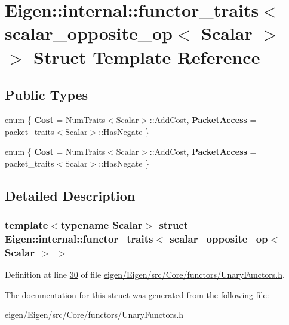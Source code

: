 \hypertarget{struct_eigen_1_1internal_1_1functor__traits_3_01scalar__opposite__op_3_01_scalar_01_4_01_4}{}\section{Eigen\+:\+:internal\+:\+:functor\+\_\+traits$<$ scalar\+\_\+opposite\+\_\+op$<$ Scalar $>$ $>$ Struct Template Reference}
\label{struct_eigen_1_1internal_1_1functor__traits_3_01scalar__opposite__op_3_01_scalar_01_4_01_4}
\subsection*{Public Types}
\begin{DoxyCompactItemize}
\item 
\mbox{\label{struct_eigen_1_1internal_1_1functor__traits_3_01scalar__opposite__op_3_01_scalar_01_4_01_4_afadcdb94bd849ac027779527420a3448}} 
enum \{ {\bfseries Cost} = Num\+Traits$<$Scalar$>$\+:\+:Add\+Cost, 
{\bfseries Packet\+Access} = packet\+\_\+traits$<$Scalar$>$\+:\+:Has\+Negate
 \}
\item 
\mbox{\label{struct_eigen_1_1internal_1_1functor__traits_3_01scalar__opposite__op_3_01_scalar_01_4_01_4_aedd367468a308aec9d1e1221622f6340}} 
enum \{ {\bfseries Cost} = Num\+Traits$<$Scalar$>$\+:\+:Add\+Cost, 
{\bfseries Packet\+Access} = packet\+\_\+traits$<$Scalar$>$\+:\+:Has\+Negate
 \}
\end{DoxyCompactItemize}


\subsection{Detailed Description}
\subsubsection*{template$<$typename Scalar$>$\newline
struct Eigen\+::internal\+::functor\+\_\+traits$<$ scalar\+\_\+opposite\+\_\+op$<$ Scalar $>$ $>$}



Definition at line \hyperlink{eigen_2_eigen_2src_2_core_2functors_2_unary_functors_8h_source_l00030}{30} of file \hyperlink{eigen_2_eigen_2src_2_core_2functors_2_unary_functors_8h_source}{eigen/\+Eigen/src/\+Core/functors/\+Unary\+Functors.\+h}.



The documentation for this struct was generated from the following file\+:\begin{DoxyCompactItemize}
\item 
eigen/\+Eigen/src/\+Core/functors/\+Unary\+Functors.\+h\end{DoxyCompactItemize}
